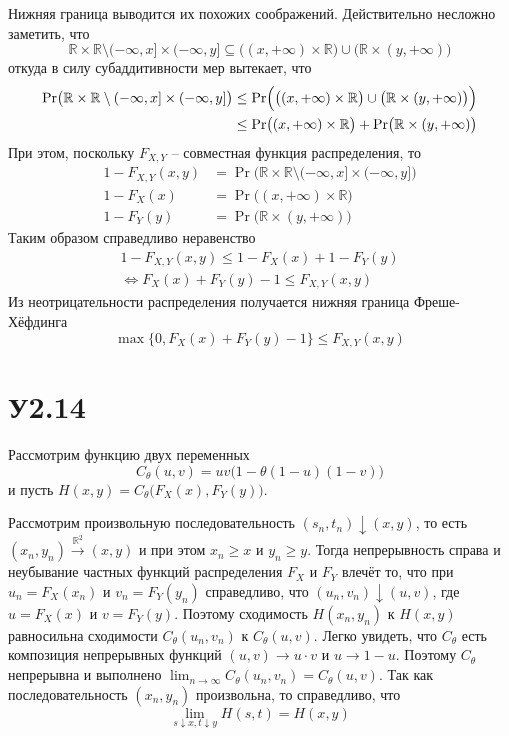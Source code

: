 \documentclass[a4paper]{article}
\newcommand{\Real}{\mathbb{R}}
\begin{document}
Нижняя граница выводится их похожих соображений. Действительно несложно заметить,
что
\[
\Real\times \Real \setminus (-\infty,x]\times (-\infty,y]
\subseteq \bigl((x,+\infty)\times\Real\bigr) \cup \bigl(\Real\times(y,+\infty)\bigr)
\]
откуда в силу субаддитивности мер вытекает, что
\begin{align*}
	\Pr\bigl( \Real\times \Real \setminus (-\infty,x]\times (-\infty,y] \bigr)
	&\leq \Pr\Bigl( \bigl((x,+\infty)\times\Real\bigr) \cup \bigl(\Real\times(y,+\infty)\bigr) \Bigr)\\
	&\leq \Pr\bigl( (x,+\infty)\times \Real \bigr) + \Pr\bigl( \Real\times (y,+\infty) \bigr)
\end{align*}
При этом, поскольку $F_{X,Y}$ -- совместная функция распределения, то
\begin{align*}
	1-F_{X,Y}(x,y) &= \Pr\bigl( \Real\times \Real \setminus (-\infty,x]\times (-\infty,y] \bigr)\\
	1-F_X(x) &= \Pr\bigl( (x,+\infty)\times \Real \bigr)\\
	1-F_Y(y) &= \Pr\bigl( \Real\times (y,+\infty) \bigr)
\end{align*}
Таким образом справедливо неравенство
\begin{multline*}
	1-F_{X,Y}(x,y) \leq 1-F_X(x) + 1-F_Y(y) \\ \Leftrightarrow F_X(x) + F_Y(y) - 1 \leq F_{X,Y}(x,y)
\end{multline*}
Из неотрицательности распределения получается нижняя граница Фреше-Хёфдинга
\[ \max\bigl\{0,F_X(x) + F_Y(y) - 1\bigr\} \leq F_{X,Y}(x,y) \]


\section{У2.14} %
\label{sec:problem_2_14}

Рассмотрим функцию двух переменных
\[C_\theta(u,v) = uv \bigl(1-\theta(1-u)(1-v)\bigr)\]
и пусть $H(x,y) = C_\theta\bigl(F_X(x), F_Y(y)\bigr)$.

Рассмотрим произвольную последовательность $(s_n,t_n) \downarrow (x,y)$, то есть
$(x_n,y_n) \overset{\Real^2}{\to}(x,y)$ и при этом $x_n\geq x$ и $y_n\geq y$. Тогда
непрерывность справа и неубывание частных функций распределения $F_X$ и $F_Y$ влечёт
то, что при $u_n=F_X(x_n)$ и $v_n=F_Y(y_n)$ справедливо, что $(u_n,v_n)\downarrow (u,v)$,
где $u=F_X(x)$ и $v=F_Y(y)$. Поэтому сходимость $H(x_n,y_n)$ к $H(x,y)$ равносильна
сходимости $C_\theta(u_n,v_n)$ к $C_\theta(u,v)$. Легко увидеть, что $C_\theta$ есть
композиция непрерывных функций $(u,v)\to u\cdot v$ и $u\to 1-u$. Поэтому $C_\theta$
непрерывна и выполнено $\lim_{n\to \infty} C_\theta(u_n,v_n) = C_\theta(u,v)$.
Так как последовательность $(x_n,y_n)$ произвольна, то справедливо, что
\[\lim_{s\downarrow x,t\downarrow y} H(s,t) = H(x,y)\]
\end{document}

